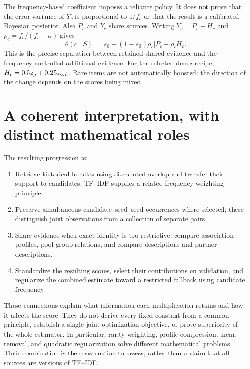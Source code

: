\documentclass[11pt,a4paper]{article}
\begin{document}
The frequency-based coefficient imposes a reliance policy. It does not prove
that the error variance of $Y_c$ is proportional to $1/f_c$ or that the result
is a calibrated Bayesian posterior. Also $P_c$ and $Y_c$ share sources.
Writing $Y_c=P_c+H_c$ and $\rho_c=f_c/(f_c+\kappa)$ gives
\[
 \theta(c\mid S)=\bigl[s_0+(1-s_0)\rho_c\bigr]P_c+\rho_c H_c.
\]
This is the precise separation between retained shared evidence and the
frequency-controlled additional evidence. For the selected dense recipe,
$H_c=0.5z_g+0.25z_{\rm svd}$. Rare items are not automatically boosted:
the direction of the change depends on the scores being mixed.

\section{A coherent interpretation, with distinct mathematical roles}
The resulting progression is:
\begin{enumerate}
\item Retrieve historical bundles using discounted overlap and transfer their
support to candidates. TF--IDF supplies a related frequency-weighting principle.
\item Preserve simultaneous candidate--seed--seed occurrences where selected;
these distinguish joint observations from a collection of separate pairs.
\item Share evidence when exact identity is too restrictive: compare association
profiles, pool group relations, and compare descriptions and partner descriptions.
\item Standardize the resulting scores, select their contributions on validation,
and regularize the combined estimate toward a restricted fallback using candidate
frequency.
\end{enumerate}
These connections explain what information each multiplication retains and how
it affects the score. They do not derive every fixed constant from a common
principle, establish a single joint optimization objective, or prove superiority
of the whole estimator. In particular, rarity weighting, profile compression,
mean removal, and quadratic regularization solve different mathematical problems.
Their combination is the construction to assess, rather than a claim that all
sources are versions of TF--IDF.
\end{document}
